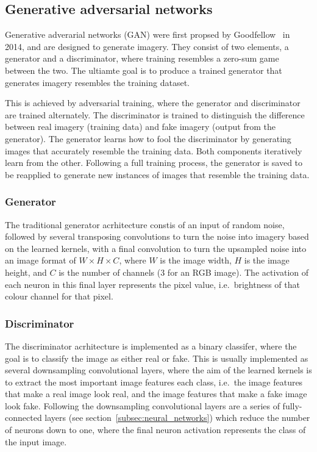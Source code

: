 \subsection{Generative adversarial networks}
Generative adverarial networks (GAN) were first propsed by Goodfellow \etal \ in 2014, and are designed to generate imagery. They consist of two elements, a generator and a discriminator, where training resembles a zero-sum game~\cite{ref} between the two. The ultiamte goal is to produce a trained generator that generates imagery resembles the training dataset.

This is achieved by adversarial training, where the generator and discriminator are trained alternately. The discriminator is trained to distinguish the difference between real imagery (training data) and fake imagery (output from the generator). The generator learns how to fool the discriminator by generating images that accurately resemble the training data. Both components iteratively learn from the other. Following a full training process, the generator is saved to be reapplied to generate new instances of images that resemble the training data.

\subsubsection{Generator}
The traditional generator acrhitecture constis of an input of random noise, followed by several transposing convolutions to turn the noise into imagery based on the learned kernels, with a final convolution to turn the upsampled noise into an image format of $W \times H \times C$, where $W$ is the image width, $H$ is the image height, and $C$ is the number of channels (3 for an RGB image). The activation of each neuron in this final layer represents the pixel value, i.e.\ brightness of that colour channel for that pixel.

\subsubsection{Discriminator}
The discriminator acrhitecture is implemented as a binary classifer, where the goal is to classify the image as either real or fake. This is usually implemented as several downsampling convolutional layers, where the aim of the learned kernels is to extract the most important image features each class, i.e.\ the image features that make a real image look real, and the image features that make a fake image look fake. Following the downsampling convolutional layers are a series of fully-connected layers (see section~\ref{subsec:neural_networks}) which reduce the number of neurons down to one, where the final neuron activation represents the class of the input image.

